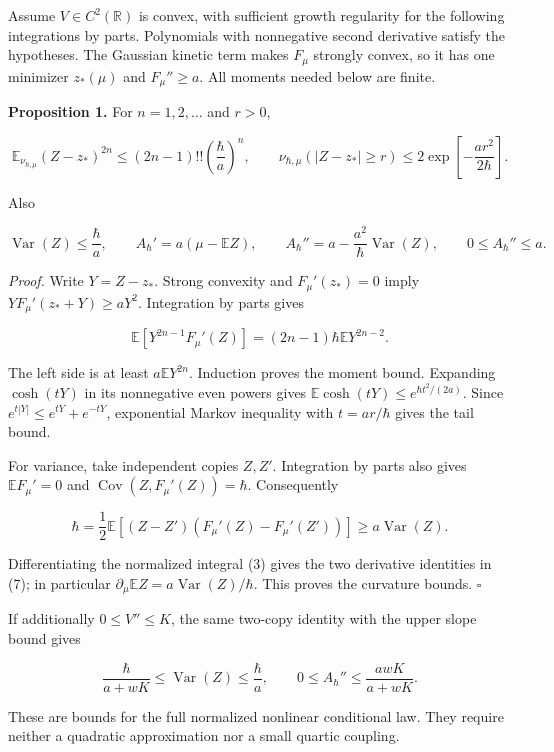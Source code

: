 \documentclass[11pt,a4paper]{article}
\begin{document}
Assume \(V\in C^2(\mathbb R)\) is convex, with sufficient growth
regularity for the following integrations by parts. Polynomials with
nonnegative second derivative satisfy the hypotheses. The Gaussian
kinetic term makes \(F_\mu\) strongly convex, so it has one minimizer
\(z_*(\mu)\) and \(F_\mu''\ge a\). All moments needed below are finite.

\textbf{Proposition 1.} For \(n=1,2,\ldots\) and \(r>0\),

\[
 \mathbb E_{\nu_{\hbar,\mu}}(Z-z_*)^{2n}
       \le(2n-1)!!\left(\frac\hbar a\right)^n,
 \qquad
 \nu_{\hbar,\mu}(|Z-z_*|\ge r)
       \le2\exp\left[-\frac{ar^2}{2\hbar}\right].
 \tag{6}
\]

Also

\[
 \operatorname{Var}(Z)\le\frac\hbar a,\qquad
 A_\hbar'=a(\mu-\mathbb EZ),\qquad
 A_\hbar''=a-\frac{a^2}{\hbar}\operatorname{Var}(Z),\qquad
 0\le A_\hbar''\le a.
 \tag{7}
\]

\emph{Proof.} Write \(Y=Z-z_*\). Strong convexity and \(F_\mu'(z_*)=0\)
imply \(YF_\mu'(z_*+Y)\ge aY^2\). Integration by parts gives

\[
 \mathbb E[Y^{2n-1}F_\mu'(Z)]
       =(2n-1)\hbar\mathbb EY^{2n-2}.
 \tag{8}
\]

The left side is at least \(a\mathbb EY^{2n}\). Induction proves the
moment bound. Expanding \(\cosh(tY)\) in its nonnegative even powers
gives \(\mathbb E\cosh(tY)\le e^{\hbar t^2/(2a)}\). Since
\(e^{t|Y|}\le e^{tY}+e^{-tY}\), exponential Markov inequality with
\(t=ar/\hbar\) gives the tail bound.

For variance, take independent copies \(Z,Z'\). Integration by parts
also gives \(\mathbb EF_\mu'=0\) and
\(\operatorname{Cov}(Z,F_\mu'(Z))=\hbar\). Consequently

\[
 \hbar=\frac12\mathbb E[(Z-Z')(F_\mu'(Z)-F_\mu'(Z'))]
       \ge a\operatorname{Var}(Z).
 \tag{9}
\]

Differentiating the normalized integral (3) gives the two derivative
identities in (7); in particular
\(\partial_\mu\mathbb EZ=a\operatorname{Var}(Z)/\hbar\). This proves the
curvature bounds. \(\square\)

If additionally \(0\le V''\le K\), the same two-copy identity with the
upper slope bound gives

\[
 \frac\hbar{a+wK}\le\operatorname{Var}(Z)\le\frac\hbar a,
 \qquad
 0\le A_\hbar''\le\frac{awK}{a+wK}.
 \tag{10}
\]

These are bounds for the full normalized nonlinear conditional law. They
require neither a quadratic approximation nor a small quartic coupling.
\end{document}
